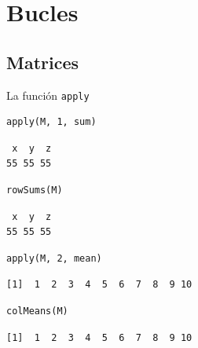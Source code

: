 \documentclass[aspectratio=169, usenames,svgnames,dvipsnames]{beamer}
\begin{document}
\section{Bucles}
\label{sec:org2751ff6}
\subsection{Matrices}
\label{sec:orge3aaf00}
\begin{frame}[label={sec:org611be34},fragile]{La función \texttt{apply}}
 \lstset{language=r,label= ,caption= ,captionpos=b,numbers=none}
\begin{lstlisting}
apply(M, 1, sum)
\end{lstlisting}

\begin{verbatim}
 x  y  z 
55 55 55
\end{verbatim}


\lstset{language=r,label= ,caption= ,captionpos=b,numbers=none}
\begin{lstlisting}
rowSums(M)
\end{lstlisting}

\begin{verbatim}
 x  y  z 
55 55 55
\end{verbatim}


\lstset{language=r,label= ,caption= ,captionpos=b,numbers=none}
\begin{lstlisting}
apply(M, 2, mean)
\end{lstlisting}

\begin{verbatim}
[1]  1  2  3  4  5  6  7  8  9 10
\end{verbatim}


\lstset{language=r,label= ,caption= ,captionpos=b,numbers=none}
\begin{lstlisting}
colMeans(M)
\end{lstlisting}

\begin{verbatim}
[1]  1  2  3  4  5  6  7  8  9 10
\end{verbatim}
\end{frame}
\end{document}
